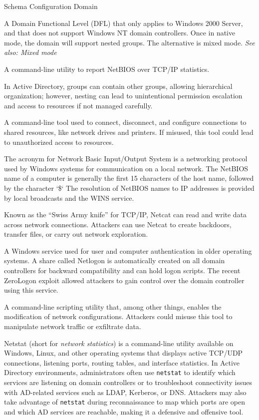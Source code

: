 Schema
Configuration
Domain

 A Domain Functional Level (DFL) that only applies to Windows 2000 Server, and that does not support Windows NT domain controllers. Once in native mode, the domain will support nested groups. The alternative is mixed mode.
\textit{See also: Mixed mode}

 A command-line utility to report NetBIOS over TCP/IP statistics.

 In Active Directory, groups can contain other groups, allowing hierarchical organization; however, nesting can lead to unintentional permission escalation and access to resources if not managed carefully.

 A command-line tool used to connect, disconnect, and configure connections to shared resources, like network drives and printers. If misused, this tool could lead to unauthorized access to resources.

 The acronym for Network Basic Input/Output System is a networking protocol used by Windows systems for communication on a local network. The NetBIOS name of a computer is generally the first 15 characters of the host name, followed by the character `\$\textperiodcentered` The resolution of NetBIOS names to IP addresses is provided by local broadcasts and the WINS service.

 Known as the “Swiss Army knife” for TCP/IP, Netcat can read and write data across network connections. Attackers can use Netcat to create backdoors, transfer files, or carry out network exploration.

 A Windows service used for user and computer authentication in older operating systems. A share called Netlogon is automatically created on all domain controllers for backward compatibility and can hold logon scripts. The recent ZeroLogon exploit allowed attackers to gain control over the domain controller using this service.

 A command-line scripting utility that, among other things, enables the modification of network configurations. Attackers could misuse this tool to manipulate network traffic or exfiltrate data.

 Netstat (short for \textit{network statistics}) is a command-line utility available on Windows, Linux, and other operating systems that displays active TCP/UDP connections, listening ports, routing tables, and interface statistics. In Active Directory environments, administrators often use \verb|netstat| to identify which services are listening on domain controllers or to troubleshoot connectivity issues with AD-related services such as LDAP, Kerberos, or DNS. Attackers may also take advantage of  \texttt{netstat} during reconnaissance to map which ports are open and which AD services are reachable, making it a defensive and offensive tool.


